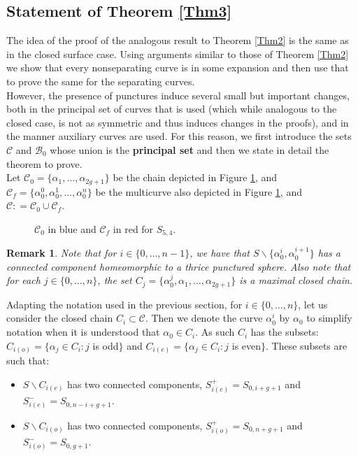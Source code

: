 \documentclass[twoside,11pt,a4paper]{article}
\newtheorem{Rem}[Def]{Remark}
\newcommand*{\Cf}{\mathscr{C}}
\newcommand*{\Cfn}{\Cf_{0}}
\newcommand*{\Cff}{\Cf_{f}}
\newcommand*{\Bf}{\mathscr{B}}
\newcommand*{\ColonEqq}{\mathrel{\mathop:}=}
\begin{document}
\subsection{Statement of Theorem \ref{Thm3}}\label{chap2sec1}
\indent The idea of the proof of the analogous result to Theorem \ref{Thm2} is the same as in the closed surface case. Using arguments similar to those of Theorem \ref{Thm2} we show that every nonseparating curve is in some expansion and then use that to prove the same for the separating curves.\\
\indent However, the presence of punctures induce several small but important changes, both in the principal set of curves that is used (which while analogous to the closed case, is not as symmetric and thus induces changes in the proofs), and in the manner auxiliary curves are used. For this reason, we first introduce the sets $\Cf$ and $\Bf_{0}$ whose union is the \textbf{principal set} and then we state in detail the theorem to prove.\\
\indent Let $\Cf_{0} = \{\alpha_{1}, \ldots, \alpha_{2g+1}\}$ be the chain depicted in Figure \ref{OriginalChainPunctured}, and $\Cf_{f} = \{\alpha_{0}^{0}, \alpha_{0}^{1}, \ldots, \alpha_{0}^{n}\}$ be the multicurve also depicted in Figure \ref{OriginalChainPunctured}, and $\Cf \ColonEqq \Cfn \cup \Cff$.
\begin{figure}[h]
 \begin{center}
  \resizebox{10cm}{!}{} \caption{$\Cf_{0}$ in blue and $\Cf_{f}$ in red for $S_{5,4}$.}\label{OriginalChainPunctured}
 \end{center}
\end{figure}
\begin{Rem}
 Note that for $i \in \{0, \ldots, n-1\}$, we have that $S \backslash \{\alpha_{0}^{i},\alpha_{0}^{i+1}\}$ has a connected component homeomorphic to a thrice punctured sphere. Also note that for each $j \in \{0, \ldots, n\}$, the set $C_{j} = \{\alpha_{0}^{j}, \alpha_{1}, \ldots, \alpha_{2g+1}\}$ is a maximal closed chain.
\end{Rem}
\indent Adapting the notation used in the previous section, for $i \in \{0, \ldots, n\}$, let us consider the closed chain $C_{i} \subset \Cf$. Then we denote the curve $\alpha_{0}^{i}$ by $\alpha_{0}$ to simplify notation when it is understood that $\alpha_{0} \in C_{i}$. As such $C_{i}$ has the subsets: $C_{i(o)} = \{\alpha_{j} \in C_{i} : j$ is odd$\}$ and $C_{i(e)} = \{\alpha_{j} \in C_{i} : j$ is even$\}$. These subsets are such that:
\begin{itemize}
 \item $S \backslash C_{i(e)}$ has two connected components, $S_{i(e)}^{+} = S_{0,i+g+1}$ and $S_{i(e)}^{-} = S_{0, n-i+ g+1}$.
 \item $S \backslash C_{i(o)}$ has two connected components, $S_{i(o)}^{+} = S_{0,n+g+1}$ and $S_{i(o)}^{-} = S_{0,g+1}$.
\end{itemize}
\end{document}
